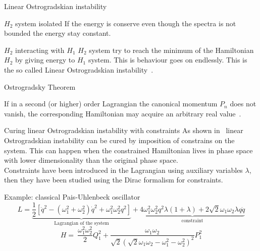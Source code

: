\begin{frame}{Linear Ostrogradskian instability}
  \begin{alertblock}{$H_2$ system isolated}
    \vspace{0.5em}
    If the energy is conserve even though the spectra is not bounded the
    energy stay constant.
  \end{alertblock}
  \vspace{2.0em}
  \begin{alertblock}{$H_2$ interacting with $H_1$}
    \vspace{0.5em}
    $H_2$ system try to reach the minimum of the Hamiltonian $H_2$ by giving
    energy to $H_1$ system. This is behaviour goes on endlessly. This is the
    so called \alert{Linear Ostrogradskian instability}~\cite{Kallosh08,
    Eliezer89}.
  \end{alertblock}
\end{frame}

\begin{frame}{Ostrogradsky Theorem}
  \begin{theorem}[Ostrogradsky] \vspace{0.5em}
    If in a second (or higher) order Lagrangian the canonical momentum $P_n$
    does not vanish, the corresponding Hamiltonian may acquire an arbitrary
    real value~\cite{Smilga17}.
  \end{theorem}
\end{frame}

\begin{frame}{Curing linear Ostrogradskian instability with constraints}
  As shown in~\cite{Chen13} linear Ostrogradskian instability can be cured by
  imposition of constrains on the system. This can happen when the constrained
  Hamiltonian lives in phase space with lower dimensionality than the original
  phase space.\\\vspace{0.3em}
  Constraints have been introduced in the Lagrangian using auxiliary variables
  $\lambda$, then they have been studied using the Dirac formalism for
  constraints.\vspace{0.7em}

  \begin{block}{Example: classical Pais-Uhlenbeck oscillator}
    \vspace{0.2em}
    \begin{equation*}
      L =
      \underbrace{
        \frac{1}{2} \left[
        \ddot{q}^2 - (\omega_1^2 + \omega_2^2) \dot{q}^2 +
        \omega_1^2 \omega_2^2 q^2 \right]
      }_{\text{Lagrangian of the system}} +
      \underbrace{
        4 \omega_1^2\omega_2^2 q^2 \lambda (1+ \lambda) +
        2 \sqrt{2} \omega_1\omega_2 \lambda q \ddot{q}
      }_{\text{constraint}}
    \end{equation*}
    \vspace{0.2em}
    \begin{equation*}
      H =\ \frac{\omega_1^2\omega_2^2}{2} Q_1^2 +
      \frac{\omega_1\omega_2}{\sqrt{2} {\left(\sqrt{2} \omega_1\omega_2 -
      \omega_1^2 - \omega_2^2 \right)}^2} P_1^2
    \end{equation*}
  \end{block}
\end{frame}



